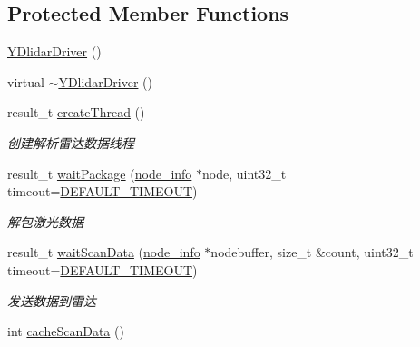 \subsection*{Protected Member Functions}
\begin{DoxyCompactItemize}
\item 
\hyperlink{classydlidar_1_1_y_dlidar_driver_a19e20b6aa35834507a0dacc8a3c510e6}{Y\+Dlidar\+Driver} ()
\item 
virtual \hyperlink{classydlidar_1_1_y_dlidar_driver_a87a50f9f1093a93b4d985f3e8bf27fde}{$\sim$\+Y\+Dlidar\+Driver} ()
\item 
result\+\_\+t \hyperlink{classydlidar_1_1_y_dlidar_driver_a2d2b317fa6381009222e03670812e917}{create\+Thread} ()
\begin{DoxyCompactList}\small\item\em 创建解析雷达数据线程 ~\newline
\end{DoxyCompactList}\item 
result\+\_\+t \hyperlink{classydlidar_1_1_y_dlidar_driver_aaf78903693f58c7f739dfa493573b3b1}{wait\+Package} (\hyperlink{structnode__info}{node\+\_\+info} $\ast$node, uint32\+\_\+t timeout=\hyperlink{classydlidar_1_1_y_dlidar_driver_a13a4f2dc4067b43794b2c47c06d5d27aa07c79ce96f468ff4b40495ef84584442}{D\+E\+F\+A\+U\+L\+T\+\_\+\+T\+I\+M\+E\+O\+UT})
\begin{DoxyCompactList}\small\item\em 解包激光数据 ~\newline
\end{DoxyCompactList}\item 
result\+\_\+t \hyperlink{classydlidar_1_1_y_dlidar_driver_a574996217284ce34191a2f3675a9f17b}{wait\+Scan\+Data} (\hyperlink{structnode__info}{node\+\_\+info} $\ast$nodebuffer, size\+\_\+t \&count, uint32\+\_\+t timeout=\hyperlink{classydlidar_1_1_y_dlidar_driver_a13a4f2dc4067b43794b2c47c06d5d27aa07c79ce96f468ff4b40495ef84584442}{D\+E\+F\+A\+U\+L\+T\+\_\+\+T\+I\+M\+E\+O\+UT})
\begin{DoxyCompactList}\small\item\em 发送数据到雷达 ~\newline
\end{DoxyCompactList}\item 
int \hyperlink{classydlidar_1_1_y_dlidar_driver_ab462b22dc3a4d39fef4f722345a87d5e}{cache\+Scan\+Data} ()\hypertarget{classydlidar_1_1_y_dlidar_driver_ab462b22dc3a4d39fef4f722345a87d5e}{}\label{classydlidar_1_1_y_dlidar_driver_ab462b22dc3a4d39fef4f722345a87d5e}


\end{DoxyCompactItemize}
